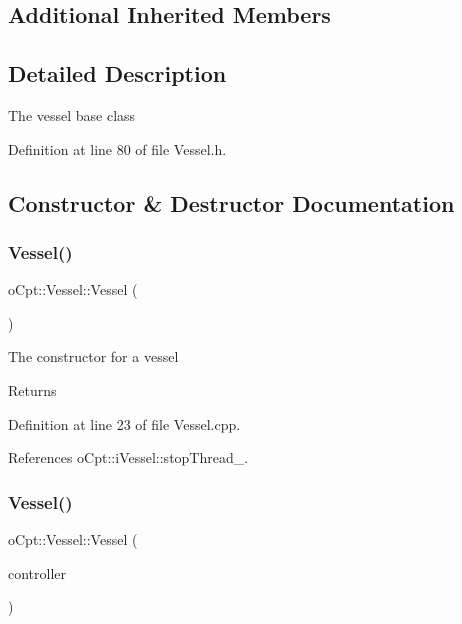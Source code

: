 \subsection*{Additional Inherited Members}


\subsection{Detailed Description}
The vessel base class 

Definition at line 80 of file Vessel.\+h.



\subsection{Constructor \& Destructor Documentation}
\hypertarget{classo_cpt_1_1_vessel_ab6dd985345a5c23e200db425553f8358}{}\label{classo_cpt_1_1_vessel_ab6dd985345a5c23e200db425553f8358} 
\subsubsection{\texorpdfstring{Vessel()}{Vessel()}\hspace{0.1cm}{\footnotesize\ttfamily [1/2]}}
{\footnotesize\ttfamily o\+Cpt\+::\+Vessel\+::\+Vessel (\begin{DoxyParamCaption}{ }\end{DoxyParamCaption})}

The constructor for a vessel \begin{DoxyReturn}{Returns}

\end{DoxyReturn}


Definition at line 23 of file Vessel.\+cpp.



References o\+Cpt\+::i\+Vessel\+::stop\+Thread\+\_\+.

\hypertarget{classo_cpt_1_1_vessel_ac8dacffe9254893d8e55b6c08fbca6c2}{}\label{classo_cpt_1_1_vessel_ac8dacffe9254893d8e55b6c08fbca6c2} 
\subsubsection{\texorpdfstring{Vessel()}{Vessel()}\hspace{0.1cm}{\footnotesize\ttfamily [2/2]}}
{\footnotesize\ttfamily o\+Cpt\+::\+Vessel\+::\+Vessel (\begin{DoxyParamCaption}\item[{\hyperlink{classo_cpt_1_1i_controller_a6d89a95cd6ad68bb74adfaca2f36370f}{i\+Controller\+::ptr}}]{controller }\end{DoxyParamCaption})}

